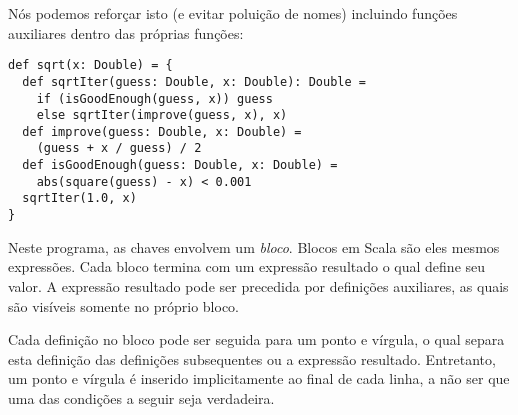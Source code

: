 N\'{o}s podemos refor\c{c}ar isto (e evitar polui\c{c}\~{a}o de nomes) incluindo
fun\c{c}\~{o}es auxiliares dentro das pr\'{o}prias fun\c{c}\~{o}es: 
\begin{lstlisting}
def sqrt(x: Double) = {
  def sqrtIter(guess: Double, x: Double): Double =
    if (isGoodEnough(guess, x)) guess
    else sqrtIter(improve(guess, x), x)
  def improve(guess: Double, x: Double) =
    (guess + x / guess) / 2
  def isGoodEnough(guess: Double, x: Double) =
    abs(square(guess) - x) < 0.001
  sqrtIter(1.0, x)
}
\end{lstlisting}

Neste programa, as chaves  envolvem um {\em bloco}. 
Blocos em Scala s\~{a}o eles mesmos express\~{o}es. Cada bloco termina com um
express\~{a}o resultado o qual define seu valor. A express\~{a}o  resultado pode 
ser precedida por defini\c{c}\~{o}es auxiliares, as quais s\~{a}o vis\'{i}veis somente no
pr\'{o}prio bloco. 

Cada defini\c{c}\~{a}o no bloco pode ser seguida para um ponto e v\'{i}rgula, o qual 
separa esta defini\c{c}\~{a}o das defini\c{c}\~{o}es subsequentes ou a express\~{a}o  resultado.
Entretanto, um ponto e v\'{i}rgula \'{e} inserido implicitamente ao final de cada linha,
a n\~{a}o ser que uma das condi\c{c}\~{o}es a seguir seja verdadeira.

